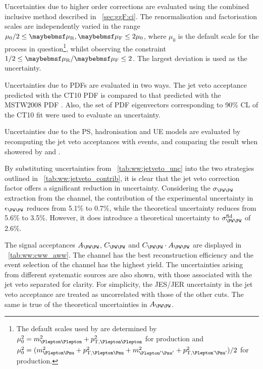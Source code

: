 Uncertainties due to higher order corrections are evaluated using the combined inclusive 
method described in \Section~\ref{sec:ggF:ci}. The renormalisation and factorisation 
scales are independently varied in the range $\mu_0/2 \leq \mur,\muf \leq 2\mu_0$, where 
$\mu_0$ is the default scale for the process in question\footnote{
	The default scales used by \mcatnlo are determined by 
	$\mu_0^2 = m_{\Plepton\Plepton}^2 + p_{\text{T,\HepProcess{\Plepton\Plepton}}}^2$ 
	for \PZ production and 
	$\mu_0^2 = (m_{\Plepton\Pnu}^2 + p_{\text{T,\HepProcess{\Plepton\Pnu}}}^2 + 
	m_{\Plepton'\Pnu'}^2 + p_{\text{T,\HepProcess{\Plepton'\Pnu'}}}^2) / 2$
	for \WW production.
}, whilst observing the constraint $1/2 \leq \mur/\muf \leq 2$. The largest deviation is 
used as the uncertainty.

Uncertainties due to \acp{PDF} are evaluated in two ways. The jet veto acceptance 
predicted with the CT10 PDF is compared to that predicted with the MSTW2008 PDF 
\cite{MSTW}. Also, the set of PDF eigenvectors corresponding to 90\% \ac{CL} of the CT10 
fit were used to evaluate an uncertainty.

Uncertainties due to the \ac{PS}, hadronisation and \ac{UE} models are evaluated by 
recomputing the jet veto acceptances with \powhegbox events, and comparing the result 
when showered by \fherwig and .

By substituting uncertainties from \Table~\ref{tab:ww:jetveto_unc} into the two 
strategies outlined in \Table~\ref{tab:ww:jetveto_contrib}, it is clear that the jet veto 
correction factor offers a significant reduction in uncertainty. Considering the 
$\sigma_{\WW}$ extraction from the \emch channel, the contribution of the experimental 
uncertainty in $\epsilon_{\WW}$ reduces from 5.1\% to 0.7\%, while the theoretical 
uncertainty reduces from 5.6\% to 3.5\%. However, it does introduce a theoretical 
uncertainty to $\sigma^{\text{fid}}_{\WW}$ of 2.6\%.

The signal acceptances $A_{\WW}$, $C_{\WW}$ and $C_{\WW} \cdot A_{\WW}$ are displayed in 
\Table~\ref{tab:ww:cww_aww}. The \mmch channel has the best reconstruction efficiency and 
the event selection of the \emch channel has the highest yield. The uncertainties arising 
from different systematic sources are also shown, with those associated with the jet veto 
separated for clarity. For simplicity, the JES/JER uncertainty in the jet veto acceptance 
are treated as uncorrelated with those of the other cuts. The same is true of the 
theoretical uncertainties in $A_{\WW}$. 

